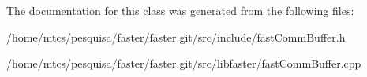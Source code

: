 The documentation for this class was generated from the following files\+:\begin{DoxyCompactItemize}
\item 
/home/mtcs/pesquisa/faster/faster.\+git/src/include/fast\+Comm\+Buffer.\+h\item 
/home/mtcs/pesquisa/faster/faster.\+git/src/libfaster/fast\+Comm\+Buffer.\+cpp\end{DoxyCompactItemize}

